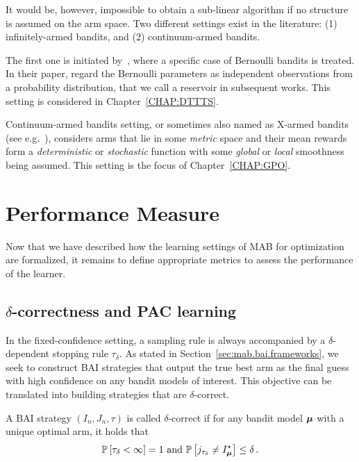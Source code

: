 It would be, however, impossible to obtain a sub-linear algorithm if no structure is assumed on the arm space. Two different settings exist in the literature: (1) \gls{infinitely-armed bandits}, and (2) \gls{continuum-armed bandits}. 

The first one is initiated by~\cite{berry1997infinite}, where a specific case of Bernoulli bandits is treated. In their paper, \cite{berry1997infinite} regard the Bernoulli parameters as independent observations from a probability distribution, that we call a \gls{reservoir} in subsequent works. This setting is considered in Chapter~\ref{CHAP:DTTTS}.

Continuum-armed bandits setting, or sometimes also named as \gls{X-armed bandits} (see e.g.~\citealt{bubeck2010x}), considers arms that lie in some \emph{metric} space and their mean rewards form a \emph{deterministic} or \emph{stochastic} function with some \emph{global} or \emph{local} smoothness being assumed. This setting is the focus of Chapter~\ref{CHAP:GPO}.

\section{Performance Measure}\label{sec:mab.performance}

Now that we have described how the learning settings of MAB for optimization are formalized, it remains to define appropriate metrics to assess the performance of the learner.

\subsection{$\delta$-correctness and PAC learning}\label{sec:mab.performance.pac}

In the fixed-confidence setting, a sampling rule is always accompanied by a $\delta$-dependent stopping rule $\tau_{\delta}$. As stated in Section~\ref{sec:mab.bai.frameworks}, we seek to construct BAI strategies that output the true best arm as the final guess with high confidence on any bandit models of interest. This objective can be translated into building strategies that are $\delta$-correct.

\begin{definition}\label{def:mab.delta}
\begin{leftbar}[defnbar]
A BAI strategy $(I_n,J_n,\tau)$ is called $\delta$-correct if for any bandit model ${\boldsymbol \mu}$ with a unique optimal arm, it holds that
\[
	\mathbb{P}\left[\tau_\delta < \infty\right] = 1 \text{ and } \mathbb{P}\left[j_{\tau_\delta}\neq I_{{\boldsymbol \mu}}^{\star}\right] \leq \delta\,.
\]
\end{leftbar}
\end{definition}

